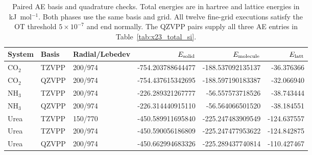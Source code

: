 \begin{table}[htbp]
\centering
\small
\caption{Paired AE basis and quadrature checks. Total energies are in hartree and lattice energies in kJ~mol$^{-1}$. Both phases use the same basis and grid. All twelve fine-grid executions satisfy the OT threshold $5\times10^{-7}$ and end normally. The QZVPP pairs supply all three AE entries in Table~\ref{tab:x23_total_si}.}
\label{tab:urea-basis}
\begin{tabular}{lllrrr}
\toprule
System & Basis & Radial/Lebedev & $E_{\rm solid}$ & $E_{\rm molecule}$ & $E_{\rm latt}$\\
\midrule
CO$_2$ & TZVPP & 200/974 & -754.203788644477 & -188.537092135137 & -36.376366\\
CO$_2$ & QZVPP & 200/974 & -754.437615342695 & -188.597190183387 & -32.066940\\
NH$_3$ & TZVPP & 200/974 & -226.289321267777 & -56.557573718526 & -38.743444\\
NH$_3$ & QZVPP & 200/974 & -226.314440915110 & -56.564066501520 & -38.184551\\
Urea & TZVPP & 150/770 & -450.589911695840 & -225.247483909549 & -124.637557\\
Urea & TZVPP & 200/974 & -450.590056186809 & -225.247477953622 & -124.842875\\
Urea & QZVPP & 200/974 & -450.662994683326 & -225.289437740814 & -110.427467\\
\bottomrule
\end{tabular}
\end{table}
